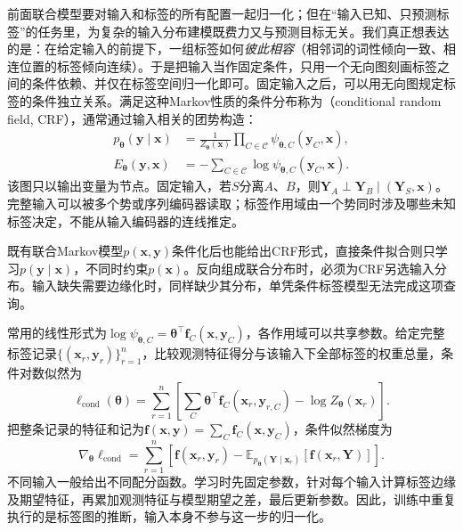 前面联合模型要对输入和标签的所有配置一起归一化；但在“输入已知、只预测标签”的任务里，为复杂的输入分布建模既费力又与预测目标无关。我们真正想表达的是：在给定输入的前提下，一组标签如何\emph{彼此相容}（相邻词的词性倾向一致、相连位置的标签倾向连续）。于是把输入当作固定条件，只用一个无向图刻画标签之间的条件依赖、并仅在标签空间归一化即可。固定输入之后，可以用无向图规定标签的条件独立关系。满足这种Markov性质的条件分布称为（conditional random field, CRF），通常通过输入相关的团势构造：
\begin{equation}
  \begin{aligned}
    p_{\bm{\theta}}(\bm{y}\mid\bm{x})
      &=\frac{1}{Z_{\bm{\theta}}(\bm{x})}
          \prod_{C\in\mathcal{C}}
             \psi_{\bm{\theta},C}(\bm{y}_C,\bm{x}),\\
    E_{\bm{\theta}}(\bm{y},\bm{x})
      &=-\sum_{C\in\mathcal{C}}
             \log\psi_{\bm{\theta},C}(\bm{y}_C,\bm{x}).
  \end{aligned}
  \label{eq:pgm-energy-models-crf-factors}
\end{equation}
该图只以输出变量为节点。固定输入，若$S$分离$A$、$B$，则$\bm{Y}_A\perp\bm{Y}_B\mid(\bm{Y}_S,\bm{x})$。完整输入可以被多个势或序列编码器读取；标签作用域由一个势同时涉及哪些未知标签决定，不能从输入编码器的连线推定。

既有联合Markov模型$p(\bm{x},\bm{y})$条件化后也能给出CRF形式，直接条件拟合则只学习$p(\bm{y}\mid\bm{x})$，不同时约束$p(\bm{x})$。反向组成联合分布时，必须为CRF另选输入分布。输入缺失需要边缘化时，同样缺少其分布，单凭条件标签模型无法完成这项查询。

常用的线性形式为$\log\psi_{\bm{\theta},C}=\bm{\theta}^\top\bm{f}_C(\bm{x},\bm{y}_C)$，各作用域可以共享参数。给定完整标签记录$\{(\bm{x}_r,\bm{y}_r)\}_{r=1}^n$，比较观测特征得分与该输入下全部标签的权重总量，条件对数似然为
\begin{equation}
  \ell_{\mathrm{cond}}(\bm{\theta})
    =\sum_{r=1}^n
       \left[
        \sum_C\bm{\theta}^\top
                    \bm{f}_C(\bm{x}_r,\bm{y}_{r,C})
        -\log Z_{\bm{\theta}}(\bm{x}_r)
       \right].
  \label{eq:pgm-energy-models-crf-likelihood}
\end{equation}
把整条记录的特征和记为$\bm{f}(\bm{x},\bm{y})=\sum_C\bm{f}_C(\bm{x},\bm{y}_C)$，条件似然梯度为
\begin{equation}
  \nabla_{\bm{\theta}}\ell_{\mathrm{cond}}
    =\sum_{r=1}^n\left[
        \bm{f}(\bm{x}_r,\bm{y}_r)
        -\mathbb{E}_{p_{\bm{\theta}}(\bm{Y}\mid\bm{x}_r)}
                 [\bm{f}(\bm{x}_r,\bm{Y})]\right].
  \label{eq:pgm-energy-models-crf-gradient}
\end{equation}
不同输入一般给出不同配分函数。学习时先固定参数，针对每个输入计算标签边缘及期望特征，再累加观测特征与模型期望之差，最后更新参数。因此，训练中重复执行的是标签图的推断，输入本身不参与这一步的归一化。

